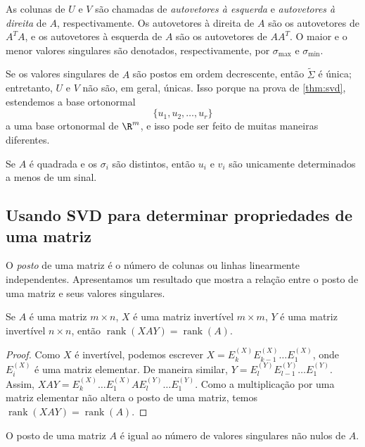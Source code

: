 \documentclass{article}
\DeclareMathOperator{\rank}{rank}
\begin{document}
As colunas de \(U\) e \(V\) são chamadas de \emph{autovetores à esquerda} e \emph{autovetores à direita} de \(A\), respectivamente. Os autovetores à direita de \(A\) são os autovetores de \(A^TA\), e os autovetores à esquerda de \(A\) são os autovetores de \(AA^T\). O maior e o menor valores singulares são denotados, respectivamente, por \(\sigma_{\max}\) e \(\sigma_{\min}\).

Se os valores singulares de \(A\) são postos em ordem decrescente, então \(\tilde{\Sigma}\) é única; entretanto, \(U\) e \(V\) não são, em geral, únicas. Isso porque na prova de \ref{thm:svd}, estendemos a base ortonormal 
\[
    \{u_1, u_2, \ldots, u_r\}
\] a uma base ortonormal de \(\R^m\), e isso pode ser feito de muitas maneiras diferentes.

\begin{rem}
    Se \(A\) é quadrada e os \(\sigma_i\) são distintos, então \(u_i\) e \(v_i\) são unicamente determinados a menos de um sinal.
\end{rem}

\subsection{Usando SVD para determinar propriedades de uma matriz}

O \emph{posto} de uma matriz é o número de colunas ou linhas linearmente independentes. Apresentamos um resultado que mostra a relação entre o posto de uma matriz e seus valores singulares.

\begin{prop}
    Se \(A\) é uma matriz \(m \times n\), \(X\) é uma matriz invertível \(m \times m\), \(Y\) é uma matriz invertível \(n \times n\), então \(\rank(XAY) = \rank(A)\).
\end{prop}

\begin{proof}
    Como \(X\) é invertível, podemos escrever \(X = E_k^{(X)} E_{k-1}^{(X)} \ldots E_1^{(X)}\), onde \(E_i^{(X)}\) é uma matriz elementar. De maneira similar, \(Y = E_l^{(Y)} E_{l-1}^{(Y)} \ldots E_1^{(Y)}\). Assim, \(XAY = E_k^{(X)} \ldots E_1^{(X)} A E_l^{(Y)} \ldots E_1^{(Y)}\). Como a multiplicação por uma matriz elementar não altera o posto de uma matriz, temos \(\rank(XAY) = \rank(A)\).
\end{proof}

\begin{prop}
    O posto de uma matriz \(A\) é igual ao número de valores singulares não nulos de \(A\).
\end{prop}
\end{document}
